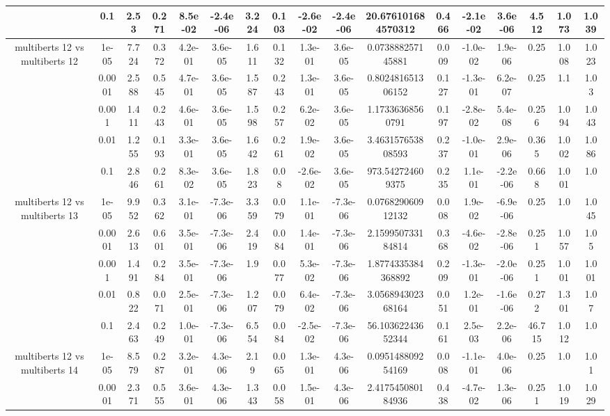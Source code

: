 \begin{tabular}{|c|c|c|c|c|c|c|c|c|c|c|c|c|c|c|c|c|}
 & 0.1 & 2.53 & 0.271 & 8.5e-02 & -2.4e-06 & 3.224 & 0.103 & -2.6e-02 & -2.4e-06 & 20.676101684570312 & 0.466 & -2.1e-02 & 3.6e-06 & 4.512 & 1.073 & 1.039 \\
\hline
\multirow{5}{*}{multiberts 12 vs multiberts 12} & 1e-05 & 7.724 & 0.372 & 4.2e-01 & 3.6e-05 & 1.611 & 0.132 & 1.3e-01 & 3.6e-05 & 0.073888257145881 & 0.009 & -1.0e-02 & 1.9e-06 & 0.25 & 1.008 & 1.023 \\
 & 0.0001 & 2.588 & 0.545 & 4.7e-01 & 3.6e-05 & 1.587 & 0.243 & 1.3e-01 & 3.6e-05 & 0.802481651306152 & 0.127 & -1.3e-01 & 6.2e-07 & 0.25 & 1.1 & 1.03 \\
 & 0.001 & 1.411 & 0.243 & 4.6e-01 & 3.6e-05 & 1.598 & 0.257 & 6.2e-02 & 3.6e-05 & 1.17336368560791 & 0.197 & -2.8e-02 & 5.4e-08 & 0.256 & 1.094 & 1.043 \\
 & 0.01 & 1.255 & 0.193 & 3.3e-01 & 3.6e-05 & 1.642 & 0.261 & 1.9e-02 & 3.6e-05 & 3.463157653808593 & 0.237 & -1.0e-01 & 2.9e-06 & 0.365 & 1.002 & 1.086 \\
 & 0.1 & 2.846 & 0.261 & 8.3e-02 & 3.6e-05 & 1.823 & 0.08 & -2.6e-02 & 3.6e-05 & 973.542724609375 & 0.235 & 1.1e-01 & -2.2e-06 & 0.668 & 1.001 & 1.0 \\
\hline
\multirow{5}{*}{multiberts 12 vs multiberts 13} & 1e-05 & 9.952 & 0.362 & 3.1e-01 & -7.3e-06 & 3.359 & 0.079 & 1.1e-01 & -7.3e-06 & 0.076829060912132 & 0.008 & 1.9e-02 & -6.9e-06 & 0.25 & 1.0 & 1.045 \\
 & 0.0001 & 2.613 & 0.601 & 3.5e-01 & -7.3e-06 & 2.419 & 0.084 & 1.4e-01 & -7.3e-06 & 2.159950733184814 & 0.368 & -4.6e-02 & -2.8e-06 & 0.251 & 1.057 & 1.05 \\
 & 0.001 & 1.491 & 0.284 & 3.5e-01 & -7.3e-06 & 1.9 & 0.077 & 5.3e-02 & -7.3e-06 & 1.8774335384368892 & 0.209 & -1.3e-01 & -2.0e-06 & 0.251 & 1.001 & 1.001 \\
 & 0.01 & 0.822 & 0.071 & 2.5e-01 & -7.3e-06 & 1.207 & 0.079 & 6.4e-02 & -7.3e-06 & 3.056894302368164 & 0.051 & 1.2e-01 & -1.6e-06 & 0.272 & 1.301 & 1.07 \\
 & 0.1 & 2.463 & 0.249 & 1.0e-01 & -7.3e-06 & 6.554 & 0.084 & -2.5e-02 & -7.3e-06 & 56.10362243652344 & 0.161 & 2.5e-03 & 2.2e-06 & 46.715 & 1.012 & 1.0 \\
\hline
\multirow{5}{*}{multiberts 12 vs multiberts 14} & 1e-05 & 8.579 & 0.287 & 3.2e-01 & 4.3e-06 & 2.19 & 0.065 & 1.3e-01 & 4.3e-06 & 0.095148809254169 & 0.008 & -1.1e-01 & 4.0e-06 & 0.25 & 1.0 & 1.01 \\
 & 0.0001 & 2.371 & 0.555 & 3.6e-01 & 4.3e-06 & 1.343 & 0.058 & 1.5e-01 & 4.3e-06 & 2.417545080184936 & 0.438 & -4.7e-02 & 1.3e-06 & 0.251 & 1.019 & 1.029 \\

\end{tabular}
